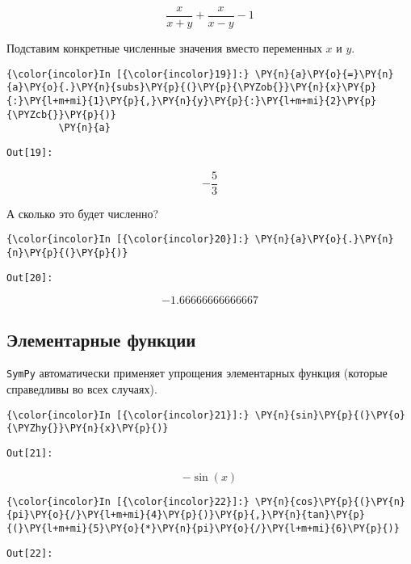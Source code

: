     \[\frac{x}{x + y} + \frac{x}{x - y} - 1\]

    

    Подставим конкретные численные значения вместо переменных \(x\) и \(y\).

    \begin{Verbatim}[commandchars=\\\{\}]
{\color{incolor}In [{\color{incolor}19}]:} \PY{n}{a}\PY{o}{=}\PY{n}{a}\PY{o}{.}\PY{n}{subs}\PY{p}{(}\PY{p}{\PYZob{}}\PY{n}{x}\PY{p}{:}\PY{l+m+mi}{1}\PY{p}{,}\PY{n}{y}\PY{p}{:}\PY{l+m+mi}{2}\PY{p}{\PYZcb{}}\PY{p}{)}
         \PY{n}{a}
\end{Verbatim}
\texttt{\color{outcolor}Out[{\color{outcolor}19}]:}
    
    \[- \frac{5}{3}\]

    

    А сколько это будет численно?

    \begin{Verbatim}[commandchars=\\\{\}]
{\color{incolor}In [{\color{incolor}20}]:} \PY{n}{a}\PY{o}{.}\PY{n}{n}\PY{p}{(}\PY{p}{)}
\end{Verbatim}
\texttt{\color{outcolor}Out[{\color{outcolor}20}]:}
    
    \[-1.66666666666667\]

    

\subsection{Элементарные функции}
\label{sympy03}

\texttt{SymPy} автоматически применяет упрощения элементарных функция
(которые справедливы во всех случаях).

    \begin{Verbatim}[commandchars=\\\{\}]
{\color{incolor}In [{\color{incolor}21}]:} \PY{n}{sin}\PY{p}{(}\PY{o}{\PYZhy{}}\PY{n}{x}\PY{p}{)}
\end{Verbatim}
\texttt{\color{outcolor}Out[{\color{outcolor}21}]:}
    
    \[- \sin{\left (x \right )}\]

    

    \begin{Verbatim}[commandchars=\\\{\}]
{\color{incolor}In [{\color{incolor}22}]:} \PY{n}{cos}\PY{p}{(}\PY{n}{pi}\PY{o}{/}\PY{l+m+mi}{4}\PY{p}{)}\PY{p}{,}\PY{n}{tan}\PY{p}{(}\PY{l+m+mi}{5}\PY{o}{*}\PY{n}{pi}\PY{o}{/}\PY{l+m+mi}{6}\PY{p}{)}
\end{Verbatim}
\texttt{\color{outcolor}Out[{\color{outcolor}22}]:}
    
